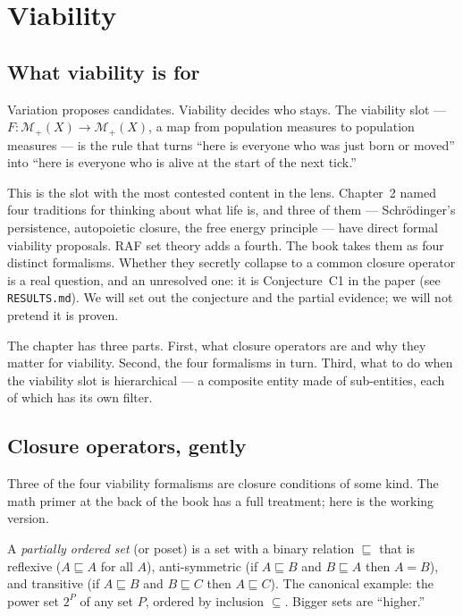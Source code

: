 \chapter{Viability}

\section{What viability is for}

Variation proposes candidates. Viability decides who stays. The
viability slot --- $F : \mathcal{M}_+(X) \to \mathcal{M}_+(X)$, a map
from population measures to population measures --- is the rule that
turns ``here is everyone who was just born or moved'' into ``here is
everyone who is alive at the start of the next tick.''

This is the slot with the most contested content in the lens. Chapter~2
named four traditions for thinking about what life is, and three of
them --- Schr\"odinger's persistence, autopoietic closure, the free
energy principle --- have direct formal viability proposals. RAF set
theory adds a fourth. The book takes them as four distinct formalisms.
Whether they secretly collapse to a common closure operator is a real
question, and an unresolved one: it is Conjecture~C1 in the paper (see
\texttt{RESULTS.md}). We will set out the conjecture and the partial
evidence; we will not pretend it is proven.

The chapter has three parts. First, what closure operators are and why
they matter for viability. Second, the four formalisms in turn. Third,
what to do when the viability slot is hierarchical --- a composite
entity made of sub-entities, each of which has its own filter.

\section{Closure operators, gently}

Three of the four viability formalisms are closure conditions of some
kind. The math primer at the back of the book has a full treatment;
here is the working version.

A \emph{partially ordered set} (or poset) is a set with a binary
relation $\sqsubseteq$ that is reflexive ($A \sqsubseteq A$ for all
$A$), anti-symmetric (if $A \sqsubseteq B$ and $B \sqsubseteq A$ then
$A = B$), and transitive (if $A \sqsubseteq B$ and $B \sqsubseteq C$
then $A \sqsubseteq C$). The canonical example: the power set $2^P$ of
any set $P$, ordered by inclusion $\subseteq$. Bigger sets are
``higher.''

